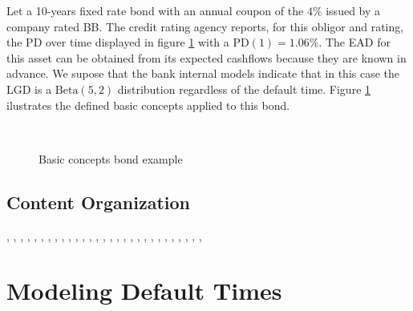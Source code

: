\documentclass[11pt,fleqn]{book} %
\begin{document}
\begin{example}[Bond]
	Let a 10-years fixed rate bond with an annual coupon of the
	$4\%$ issued by a company rated BB. The credit rating agency 
	reports, for this obligor and rating, the PD over time displayed 
	in figure \ref{figure:bond} with a $\text{PD}(1)=1.06\%$. 
	The EAD for this asset can be obtained from its expected cashflows 
	because they are known in advance. We supose that the bank 
	internal models indicate that in this case the LGD is a 
	$\text{Beta}(5,2)$ distribution regardless of the default time.
	Figure \ref{figure:bond} ilustrates the defined basic concepts 
	applied to this bond.
	\begin{figure}[!ht]
		\centering
		\\
		\caption{Basic concepts bond example}
		\label{figure:bond} 
	\end{figure}
\end{example}

\section{Content Organization}

\cite{mcneil:2005}, \cite{sklar:1959}, \cite{li:2000}, 
\cite{roncalli:2001}, \cite{embrechts:2002}, \cite{cmetrics:1997},
\cite{ntzoufras:2009}, \cite{gordy:2002}, \cite{nagpal:2001},
\cite{meissner:2006}, \cite{bis:2006}, \cite{bluhm:2002},
\cite{frey:2001}, \cite{gossl:2005}, \cite{tarashev:2010},
\cite{creditrisk+:1997}, \cite{crouhy:2000}, \cite{koyluoglu:1998},
\cite{var:varbad}, \cite{var:eshortfall}, \cite{var:jorion},
\cite{basel2:2006}, \cite{kotz:2004}, \cite{garthwaite:2010},
\cite{long:2012}, \cite{kreinin:2001}, \cite{roncalli:2004},
\cite{anderson:1984}, \cite{yi:2006}, \cite{kenney:1951}


\chapter{Modeling Default Times}
\end{document}
